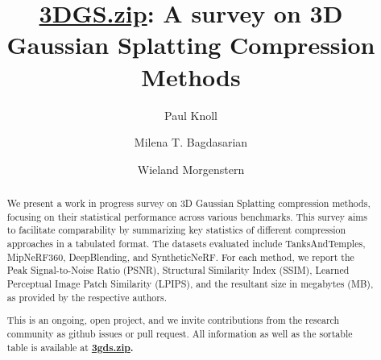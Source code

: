 \documentclass{article}
\title{\url{3DGS.zip}: A survey on 3D Gaussian Splatting Compression Methods}
\author[1]{Paul Knoll}
\author[1]{Milena T. Bagdasarian}
\author[1]{Wieland Morgenstern}
\affil[1]{Fraunhofer Heinrich Hertz, HHI}
\date{}
\begin{document}
\maketitle

\begin{abstract}

    We present a work in progress survey on 3D Gaussian Splatting compression methods, 
    focusing on their statistical performance across various benchmarks. This survey aims 
    to facilitate comparability by summarizing key statistics of different compression 
    approaches in a tabulated format. The datasets evaluated include TanksAndTemples, 
    MipNeRF360, DeepBlending, and SyntheticNeRF. For each method, we report the Peak 
    Signal-to-Noise Ratio (PSNR), Structural Similarity Index (SSIM), Learned Perceptual 
    Image Patch Similarity (LPIPS), and the resultant size in megabytes (MB), as 
    provided by the respective authors.

    This is an ongoing, open project, and we invite contributions from the research community 
    as github issues or pull request. All information as well as the sortable table is available 
    at \bfseries\url{3gds.zip}.
    
\end{abstract}
\end{document}
